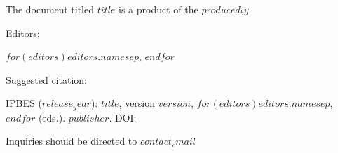 {%

  \clearpage
  \thispagestyle{fancy}

  \vspace*{\fill}

\vspace{0.30cm}

{\fontsize{12}{14}\selectfont
The document titled $title$ is a product of the $produced_by$.\par}
\vspace{0.30cm}

{\fontsize{12}{14}\selectfont Editors:\par}
{\fontsize{12}{14}\selectfont $for(editors)$$editors.name$$sep$, $endfor$\par}
\vspace{0.30cm}

{\fontsize{12}{14}\selectfont Suggested citation:\par}
{\fontsize{12}{14}\selectfont IPBES ($release_year$): $title$, version $version$, $for(editors)$$editors.name$$sep$, $endfor$ (eds.). $publisher$. DOI: \doitext{}\par}
\vspace{0.30cm}

{\fontsize{12}{14}\selectfont
Inquiries should be directed to \href{mailto:$contact_email$}{$contact_email$}\par}

  \restoregeometry
  \clearpage
}
\makeatother
